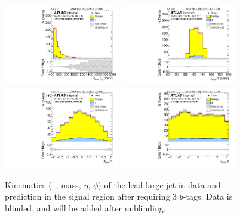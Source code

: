 \clearpage

\begin{figure}[htbp!]
\begin{center}
\includegraphics[width=0.45\textwidth,angle=-90]{figures/boosted/Signal/b77_ThreeTag_Signal_leadHCand_Pt_m_blind.pdf}
\includegraphics[width=0.45\textwidth,angle=-90]{figures/boosted/Signal/b77_ThreeTag_Signal_leadHCand_Mass_s_blind.pdf}\\
\includegraphics[width=0.45\textwidth,angle=-90]{figures/boosted/Signal/b77_ThreeTag_Signal_leadHCand_Eta_blind.pdf}
\includegraphics[width=0.45\textwidth,angle=-90]{figures/boosted/Signal/b77_ThreeTag_Signal_leadHCand_Phi_blind.pdf}
  \caption{Kinematics (\pt~, mass, $\eta$, $\phi$) of the lead large-\R jet in data and prediction in the signal region after requiring 3 $b$-tags. Data is blinded, and will be added after unblinding.}
  \label{fig:boosted-3b-signal-blind-ak10-lead}
\end{center}
\end{figure}

